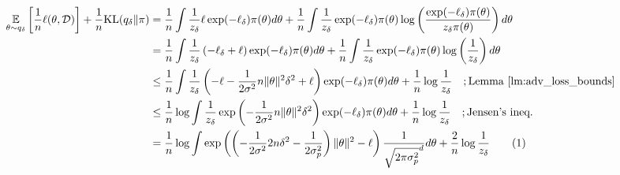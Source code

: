 \begin{align*}
    \expectation{\theta \sim { q_\delta }}{\frac{1}{n}{\ell}(\theta, \mathcal{D})} + \frac{1}{n} \mathrm{KL}({ q_\delta } \| \pi) 
    &= \frac{1}{n} \int \frac{1}{ z_\delta }{\ell}\exp(-\ell_{\delta})\pi(\theta) d\theta + \frac{1}{n} \int \frac{1}{ z_\delta } \exp(-\ell_{\delta})\pi(\theta) \log \lp \frac{\exp(-\ell_{\delta})\pi(\theta)}{ z_\delta \pi(\theta)} \rp d\theta \\
    &= \frac{1}{n} \int \frac{1}{ z_\delta }\lp -\ell_{\delta}+ \ell \rp\exp(-\ell_{\delta})\pi(\theta) d\theta + \frac{1}{n} \int \frac{1}{ z_\delta } \exp(-\ell_{\delta})\pi(\theta) \log \lp \frac{1}{ z_\delta } \rp d\theta \\
    &\leq \frac{1}{n} \int \frac{1}{ z_\delta }\lp -\ell - {\frac{1}{2\sigma^2}}n \|\theta\|^2 \delta^2 + \ell \rp\exp(-\ell_{\delta})\pi(\theta) d\theta + \frac{1}{n} \log \frac{1}{ z_\delta } \quad; \text{Lemma \ref{lm:adv_loss_bounds}} \\
    &\leq \frac{1}{n} \log \int \frac{1}{ z_\delta } \exp \lp -{\frac{1}{2\sigma^2}}n \|\theta\|^2 \delta^2 \rp \exp(-\ell_{\delta})\pi(\theta) d\theta +  \frac{1}{n} \log \frac{1}{ z_\delta } \quad; \text{Jensen's ineq.} \\
    &= \frac{1}{n} \log \int  \exp \lp \lp -{\frac{1}{2\sigma^2}}2n \delta^2 - \frac{1}{2\sigma_p^2} \rp \|\theta\|^2 - \ell \rp \frac{1}{\sqrt{2\pi \sigma_p^2}^d} d\theta  +  \frac{2}{n} \log \frac{1}{ z_\delta } \stepcounter{equation}\tag{\theequation}\label{eq:adv_post_std_loss_normz}
\end{align*}

